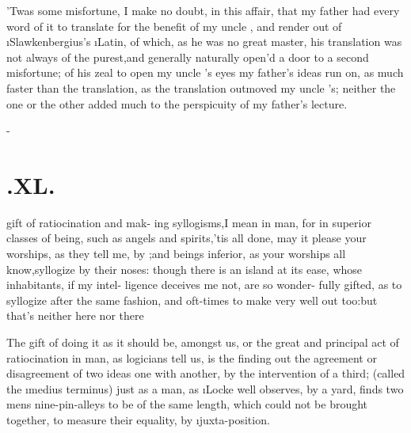 \documentclass[twoside]{article}
\begin{document}
’Twas some misfortune, I make no\break
doubt, in this affair,
that my father had every word of it to translate for the bene\-fit of
my uncle \toby, and render out of
\i{Slawkenbergius}’s \i{Latin}, of which, as he was no
great master, his translation was not always of the
purest,\tsk and generally\break {} naturally open’d a door to a second
misfortune;\tsk {}\break
of his zeal to open my uncle \toby's eyes\break
\tsh my father’s ideas run on, as much faster than the translation, as
the translation outmoved my uncle
\toby's;\tsh\break
neither the one or the other added much\break
to the perspicuity of my father’s lecture.

\null\kern-\baselineskip
\section{.\quad  XL.}

 gift of ratiocination and mak-\break
ing syllogisms,\tsh I mean in man,\break
\tsk for in superior classes of being, such\break
as angels and spirits,\tsh ’tis all done, may\break
it please your worships, as they tell me,\break
by ;\tsk and beings inferior, as\break
your worships all know,\tsk\!\tsk syllogize by\break
their noses: though there is an island\break
{}\break
at its ease, whose inhabitants, if my intel-\break
ligence deceives me not, are so wonder-\break
fully gifted, as to syllogize after the same\break
fashion, and oft-times to make very well\break
out too:\tsh but that’s neither here nor\break
there\tsh

The gift of doing it as it should be, amongst us, \tsk or the
great and principal
act of ratiocination in man, as logicians tell
us, is the finding out the agreement or disagreement of two ideas
one with another, by the intervention of a third; (called the
\i{medius terminus)\sic} just as a man, as \i{Locke} well
observes, by a yard, finds two mens nine-pin-alleys to be of the same
length, which could not be brought together, to measure their
equality, by \i{juxta-position.}
\end{document}
